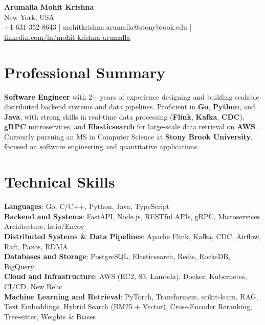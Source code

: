 \documentclass[letterpaper,11pt]{article}
\begin{document}
\begin{center}
  {\Large \textbf{Arumalla Mohit Krishna}} \\
  New York, USA \\
  +1-631-352-8643 \enspace | \enspace mohitkrishna.arumalla@stonybrook.edu \enspace | \enspace \href{https://www.linkedin.com/in/mohit-krishna-arumalla}{linkedin.com/in/mohit-krishna-arumalla}
\end{center}

\section{Professional Summary}
  \begin{itemize}[leftmargin=0.15in, label={}]
    \small{\item{
     \textbf{Software Engineer} with 2+ years of experience designing and building scalable distributed backend systems and data pipelines. Proficient in \textbf{Go}, \textbf{Python}, and \textbf{Java}, with strong skills in real-time data processing (\textbf{Flink}, \textbf{Kafka}, \textbf{CDC}), \textbf{gRPC} microservices, and \textbf{Elasticsearch} for large-scale data retrieval on \textbf{AWS}. Currently pursuing an MS in Computer Science at \textbf{Stony Brook University}, focused on software engineering and quantitative applications.
    }}
  \end{itemize}
\vspace{-16pt}

\section{Technical Skills}
 \begin{itemize}[leftmargin=0.15in, label={}]
    \small{\item{
     \textbf{Languages}: Go, C/C++, Python, Java, TypeScript \\
     \textbf{Backend and Systems}: FastAPI, Node.js, RESTful APIs, gRPC, Microservices Architecture, Istio/Envoy \\
     \textbf{Distributed Systems \& Data Pipelines}: Apache Flink, Kafka, CDC, Airflow, Raft, Paxos, RDMA \\
     \textbf{Databases and Storage}: PostgreSQL, Elasticsearch, Redis, RocksDB, BigQuery \\
     \textbf{Cloud and Infrastructure}: AWS (EC2, S3, Lambda), Docker, Kubernetes, CI/CD, New Relic \\
     \textbf{Machine Learning and Retrieval}: PyTorch, Transformers, scikit-learn, RAG, Text Embeddings, Hybrid Search (BM25 + Vector), Cross-Encoder Reranking, Tree-sitter, Weights \& Biases
    }}
 \end{itemize}
\vspace{-16pt}
\end{document}
